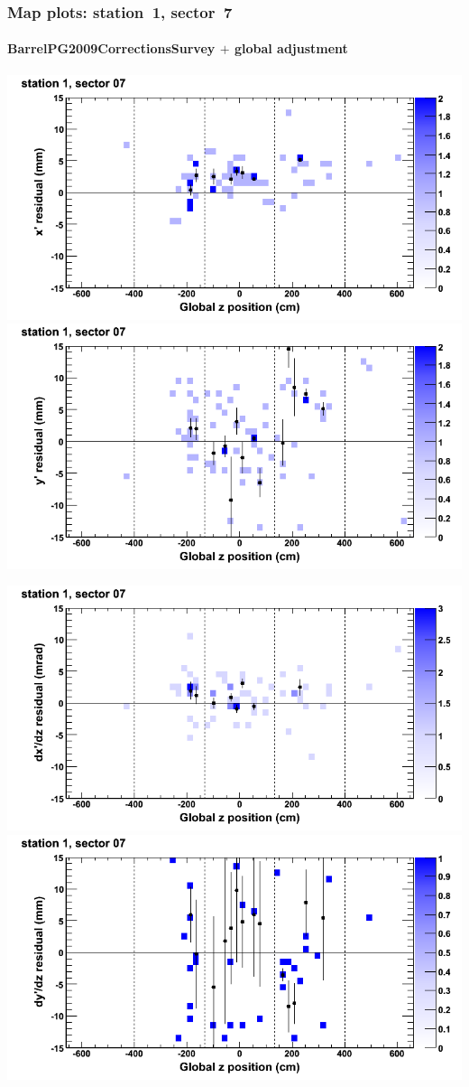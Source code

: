 \documentclass[compress]{beamer}
\begin{document}
\begin{frame}
\frametitle{Map plots: station~1, sector~7}
\framesubtitle{BarrelPG2009CorrectionsSurvey $+$ global adjustment}
\includegraphics[width=0.5\linewidth]{mapplots_re01/DTvsz_st1sec07_x.png}
\includegraphics[width=0.5\linewidth]{mapplots_re01/DTvsz_st1sec07_y.png}

\includegraphics[width=0.5\linewidth]{mapplots_re01/DTvsz_st1sec07_dxdz.png}
\includegraphics[width=0.5\linewidth]{mapplots_re01/DTvsz_st1sec07_dydz.png}
\end{frame}
\end{document}
